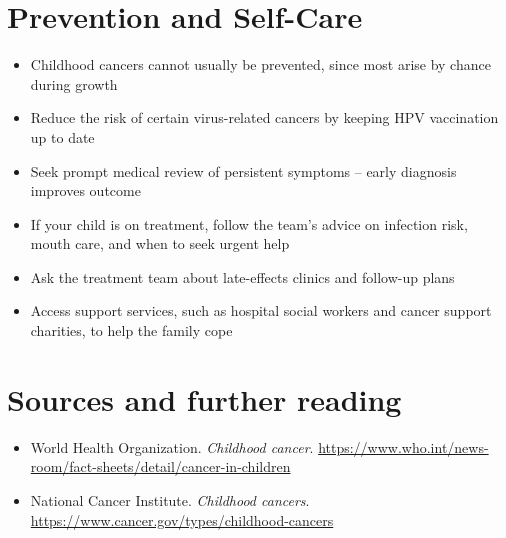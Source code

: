 \section*{Prevention and Self-Care}
\begin{itemize}
    \item Childhood cancers cannot usually be prevented, since most arise by chance during growth
    \item Reduce the risk of certain virus-related cancers by keeping HPV vaccination up to date
    \item Seek prompt medical review of persistent symptoms -- early diagnosis improves outcome
    \item If your child is on treatment, follow the team's advice on infection risk, mouth care, and when to seek urgent help
    \item Ask the treatment team about late-effects clinics and follow-up plans
    \item Access support services, such as hospital social workers and cancer support charities, to help the family cope
\end{itemize}

\section*{Sources and further reading}
\begin{itemize}
    \item World Health Organization. \textit{Childhood cancer}. \url{https://www.who.int/news-room/fact-sheets/detail/cancer-in-children}
    \item National Cancer Institute. \textit{Childhood cancers}. \url{https://www.cancer.gov/types/childhood-cancers}
\end{itemize}
